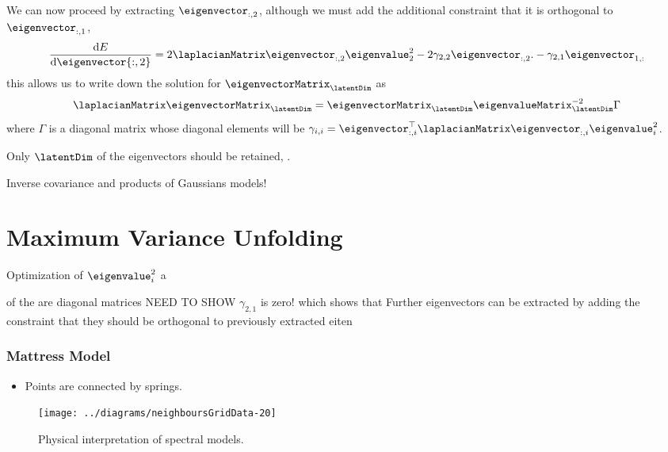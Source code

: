 We can now proceed by extracting $\eigenvector_{:, 2}$, although we must add the additional constraint that it is orthogonal to $\eigenvector_{:, 1}$,
\[
\frac{\mathrm{d}E}{\mathrm{d}\eigenvector{:, 2}} = 2\laplacianMatrix \eigenvector_{:, 2}\eigenvalue^2_2  - 2\gamma_{2, 2} \eigenvector_{:,2}. - \gamma_{2,1}\eigenvector_{1, :}
\]
this allows us to write down the solution for $\eigenvectorMatrix_\latentDim$ as
\[
\laplacianMatrix \eigenvectorMatrix_\latentDim = \eigenvectorMatrix_\latentDim \eigenvalueMatrix_\latentDim^{-2} \Gamma
\]
where $\Gamma$ is a diagonal matrix whose diagonal elements will be $\gamma_{i,i}=\eigenvector_{:, i}^\top \laplacianMatrix \eigenvector_{:, i}\eigenvalue_{i}^{2}$. 

Only $\latentDim$ of the eigenvectors should be retained, .

Inverse covariance and products of Gaussians models!


\section{Maximum Variance Unfolding}
Optimization of $\eigenvalue_{i}^2$ a







of the are diagonal matrices
NEED TO SHOW $\gamma_{2, 1}$ is zero! 
which shows that
Further eigenvectors can be extracted by adding the constraint that they should be orthogonal to previously extracted eiten



\subsubsection{Mattress Model}
\begin{itemize}
\item Points are connected by springs.
\end{itemize}  
\begin{figure}
  \texttt{[image: ../diagrams/neighboursGridData-20]}
  \caption{Physical interpretation of spectral models.}

\end{figure}



